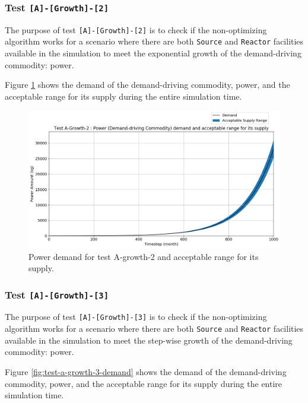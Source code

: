 \documentclass[11pt,letterpaper]{article}
\begin{document}
\subsubsection{Test \texttt{[A]-[Growth]-[2]}}
The purpose of test \texttt{[A]-[Growth]-[2]} is to check if the non-optimizing algorithm works for a scenario where there are both \texttt{Source} and \texttt{Reactor} facilities available in the simulation to meet the exponential growth of the demand-driving commodity: power. 

Figure \ref{fig:test-a-growth-2-demand} shows the demand of the demand-driving commodity, power, and the acceptable range for its supply during the entire simulation time.  

\begin{figure}[H]
	\begin{center}
		\includegraphics[scale=0.4]{./figures/Power_A-Growth-2_demand_supply.png}
	\end{center}
        \caption{Power demand for test A-growth-2 and acceptable range for its supply.}
	\label{fig:test-a-growth-2-demand}
\end{figure}

\subsubsection{Test \texttt{[A]-[Growth]-[3]}}
The purpose of test \texttt{[A]-[Growth]-[3]} is to check if the non-optimizing algorithm works for a scenario where there are both \texttt{Source} and \texttt{Reactor} facilities available in the simulation to meet the step-wise growth of the demand-driving commodity: power. 

Figure \ref{fig:test-a-growth-3-demand} shows the demand of the demand-driving commodity, power, and the acceptable range for its supply during the entire simulation time.  
\end{document}
